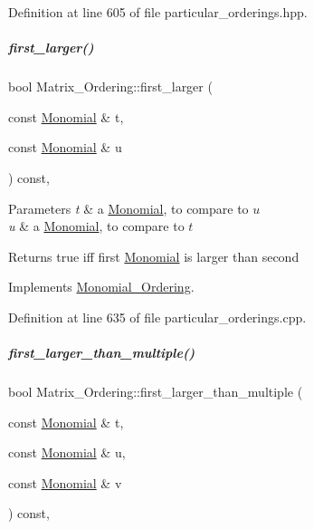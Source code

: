 Definition at line 605 of file particular\+\_\+orderings.\+hpp.

\mbox{\label{group__orderinggroup_aed327b2dfb248ac239694717c3313e31}} 
\subparagraph{\texorpdfstring{first\+\_\+larger()}{first\_larger()}}
{\footnotesize\ttfamily bool Matrix\+\_\+\+Ordering\+::first\+\_\+larger (\begin{DoxyParamCaption}\item[{const \hyperlink{group__polygroup_class_monomial}{Monomial} \&}]{t,  }\item[{const \hyperlink{group__polygroup_class_monomial}{Monomial} \&}]{u }\end{DoxyParamCaption}) const\hspace{0.3cm}{\ttfamily [override]}, {\ttfamily [virtual]}}


\begin{DoxyParams}{Parameters}
{\em t} & a \hyperlink{group__polygroup_class_monomial}{Monomial}, to compare to $ u $ \\
\hline
{\em u} & a \hyperlink{group__polygroup_class_monomial}{Monomial}, to compare to $ t $ \\
\hline
\end{DoxyParams}
\begin{DoxyReturn}{Returns}
{\ttfamily true} iff first \hyperlink{group__polygroup_class_monomial}{Monomial} is larger than second 
\end{DoxyReturn}


Implements \hyperlink{group__orderinggroup_aed41fe82e1ca5cd287a93d287fee7c20}{Monomial\+\_\+\+Ordering}.



Definition at line 635 of file particular\+\_\+orderings.\+cpp.

\mbox{\label{group__orderinggroup_ad9be3dafe786d480521cc0a31ebdef8c}} 
\subparagraph{\texorpdfstring{first\+\_\+larger\+\_\+than\+\_\+multiple()}{first\_larger\_than\_multiple()}}
{\footnotesize\ttfamily bool Matrix\+\_\+\+Ordering\+::first\+\_\+larger\+\_\+than\+\_\+multiple (\begin{DoxyParamCaption}\item[{const \hyperlink{group__polygroup_class_monomial}{Monomial} \&}]{t,  }\item[{const \hyperlink{group__polygroup_class_monomial}{Monomial} \&}]{u,  }\item[{const \hyperlink{group__polygroup_class_monomial}{Monomial} \&}]{v }\end{DoxyParamCaption}) const\hspace{0.3cm}{\ttfamily [override]}, {\ttfamily [virtual]}}



